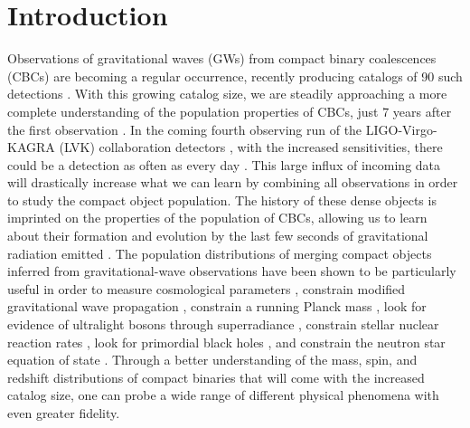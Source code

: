 \section{Introduction} \label{sec:intro}

Observations of gravitational waves (GWs) from compact binary coalescences (CBCs) are becoming a regular occurrence, 
recently producing catalogs of 90 such detections \citep{GWTC1,gwtc2,GWTC3}. With this growing catalog size, we are steadily approaching a more complete  
understanding of the population properties of CBCs, just 7 years after the first observation \citep{o1o2_pop,o3a_pop,o3b_astro_dist}. 
In the coming fourth observing run of the LIGO-Virgo-KAGRA (LVK) collaboration detectors \citep{aLIGO,aVIRGO}, with the increased sensitivities, 
there could be a detection as often as every day \citep{LVK_prospects}. This large influx of incoming data will drastically increase what we can 
learn by combining all observations in order to study the compact object population. The history of these dense objects is imprinted on the properties 
of the population  of CBCs, allowing us to learn about their formation and evolution by the last few seconds of gravitational radiation emitted \citep{Zevin_2017}. 
The population distributions of merging compact objects inferred from gravitational-wave observations have been shown to be particularly useful in order to
measure cosmological parameters \citep{Farr_2019HUB,gwtc3_cosmo}, constrain modified gravitational wave propagation \citep{ModGWProp,ModGWProp2}, 
constrain a running Planck mass \citep{Lagos_runningPlanckMass}, look for evidence of ultralight bosons through superradiance \citep{Ng_Boson2021,GWTC2_superradiance_Ng}, 
constrain stellar nuclear reaction rates \citep{Farmer_2019,Farmer_2020}, look for primordial black holes \citep{Ng_2021,KenNgPBH2022}, 
and constrain the neutron star equation of state \citep{Golomb_EOS}. Through a better understanding of the mass, spin, and redshift distributions of 
compact binaries that will come with the increased catalog size, one can probe a wide range of different physical phenomena with even greater fidelity.

